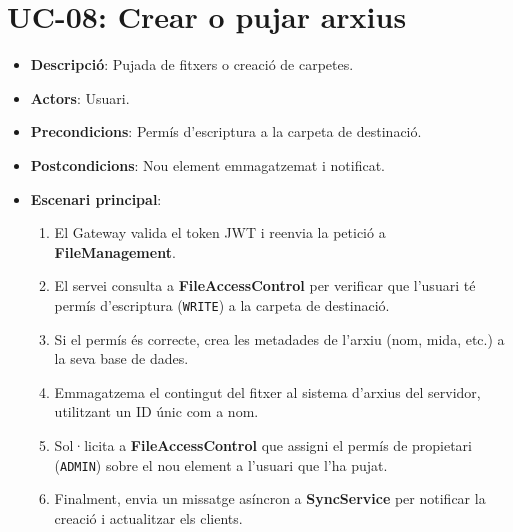 \section{UC-08: Crear o pujar arxius}
\begin{itemize}
  \item \textbf{Descripció}: Pujada de fitxers o creació de carpetes.
  \item \textbf{Actors}: Usuari.
  \item \textbf{Precondicions}: Permís d'escriptura a la carpeta de destinació.
  \item \textbf{Postcondicions}: Nou element emmagatzemat i notificat.
  \item \textbf{Escenari principal}:
    \begin{enumerate}
        \item El Gateway valida el token JWT i reenvia la petició a \textbf{FileManagement}.
        \item El servei consulta a \textbf{FileAccessControl} per verificar que l'usuari té permís d'escriptura (\texttt{WRITE}) a la carpeta de destinació.
        \item Si el permís és correcte, crea les metadades de l'arxiu (nom, mida, etc.) a la seva base de dades.
        \item Emmagatzema el contingut del fitxer al sistema d'arxius del servidor, utilitzant un ID únic com a nom.
        \item Sol·licita a \textbf{FileAccessControl} que assigni el permís de propietari (\texttt{ADMIN}) sobre el nou element a l'usuari que l'ha pujat.
        \item Finalment, envia un missatge asíncron a \textbf{SyncService} per notificar la creació i actualitzar els clients.
    \end{enumerate}
\end{itemize}

